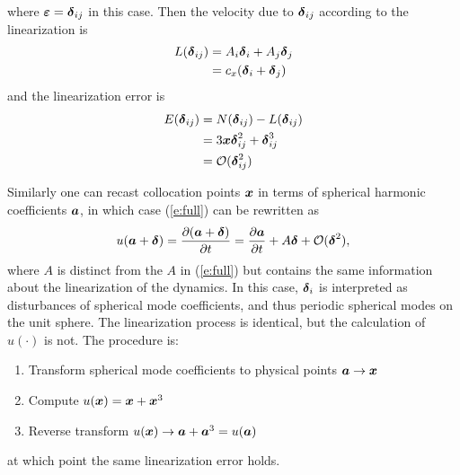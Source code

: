 \documentclass[11pt]{article}
\begin{document}
where $\mbox{\boldmath $\boldsymbol{\varepsilon}$} = \mbox{\boldmath $\boldsymbol{\delta}$}_{ij}$ in this case.  Then the velocity due to $\mbox{\boldmath $\boldsymbol{\delta}$}_{ij}$ 
according to the linearization is
\begin{align*}
	L(\mbox{\boldmath $\boldsymbol{\delta}$}_{ij}) &= A_i \mbox{\boldmath $\boldsymbol{\delta}$}_i + A_j \mbox{\boldmath $\boldsymbol{\delta}$}_j \\
	&= c_x (\mbox{\boldmath $\boldsymbol{\delta}$}_i + \mbox{\boldmath $\boldsymbol{\delta}$}_j)
\end{align*}
and the linearization error is
\begin{align*}
	E(\mbox{\boldmath $\boldsymbol{\delta}$}_{ij}) &= N(\mbox{\boldmath $\boldsymbol{\delta}$}_{ij}) - L(\mbox{\boldmath $\boldsymbol{\delta}$}_{ij}) \\
		&= 3 \mbox{\boldmath $x$} \mbox{\boldmath $\boldsymbol{\delta}$}_{ij}^2 + \mbox{\boldmath $\boldsymbol{\delta}$}_{ij}^3 \\
		&= \mathcal{O}(\mbox{\boldmath $\boldsymbol{\delta}$}_{ij}^2)
\end{align*} 
	
Similarly one can recast collocation points $\mbox{\boldmath $x$}$ in terms of spherical harmonic coefficients
$\mbox{\boldmath $a$}$, in which case (\ref{e:full}) can be rewritten as
\begin{gather}
	u(\ba + \bdelta) = \frac{ \partial (\ba + \bdelta) }{ \partial t } = \frac{ \partial \ba }{ \partial t } + A \bdelta + \mathcal{O}(\bdelta^2),
\label{e:fulla}
\end{gather}
where $A$ is distinct from the $A$ in (\ref{e:full}) but contains the same information 
about the linearization of the dynamics.  In this case, $\mbox{\boldmath $\boldsymbol{\delta}$}_i$ is interpreted
as disturbances of spherical mode coefficients, and thus periodic spherical modes on the
unit sphere.  The linearization process is identical, but the calculation of $u( \cdotp )$ is not.
The procedure is:
\begin{enumerate}
	\item Transform spherical mode coefficients to physical points $\mbox{\boldmath $a$} \to \mbox{\boldmath $x$}$
	\item Compute $u(\mbox{\boldmath $x$}) = \mbox{\boldmath $x$} + \mbox{\boldmath $x$}^3$
	\item Reverse transform $u(\mbox{\boldmath $x$}) \to \mbox{\boldmath $a$} + \mbox{\boldmath $a$}^3 = u(\mbox{\boldmath $a$})$
\end{enumerate}
at which point the same linearization error holds.
\end{document}
